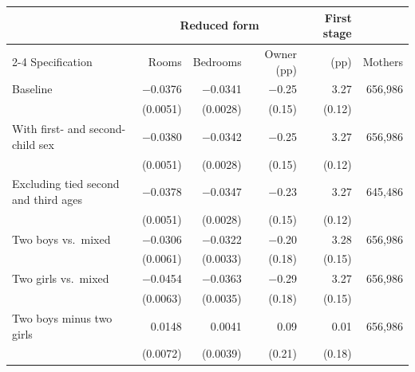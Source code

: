 \setlength{\tabcolsep}{5pt}
\begin{tabular}{@{}lrrrrr@{}}
\toprule
 & \multicolumn{3}{c}{Reduced form} & First stage & \\
\cmidrule(lr){2-4}
Specification & Rooms & Bedrooms & Owner (pp) & (pp) & Mothers \\
\midrule
Baseline & $-$0.0376 & $-$0.0341 & $-$0.25 & 3.27 & 656,986 \\
 & (0.0051) & (0.0028) & (0.15) & (0.12) & \\
With first- and second-child sex & $-$0.0380 & $-$0.0342 & $-$0.25 & 3.27 & 656,986 \\
 & (0.0051) & (0.0028) & (0.15) & (0.12) & \\
Excluding tied second and third ages & $-$0.0378 & $-$0.0347 & $-$0.23 & 3.27 & 645,486 \\
 & (0.0051) & (0.0028) & (0.15) & (0.12) & \\
Two boys vs.\ mixed & $-$0.0306 & $-$0.0322 & $-$0.20 & 3.28 & 656,986 \\
 & (0.0061) & (0.0033) & (0.18) & (0.15) & \\
Two girls vs.\ mixed & $-$0.0454 & $-$0.0363 & $-$0.29 & 3.27 & 656,986 \\
 & (0.0063) & (0.0035) & (0.18) & (0.15) & \\
Two boys minus two girls & 0.0148 & 0.0041 & 0.09 & 0.01 & 656,986 \\
 & (0.0072) & (0.0039) & (0.21) & (0.18) & \\
\bottomrule
\end{tabular}
